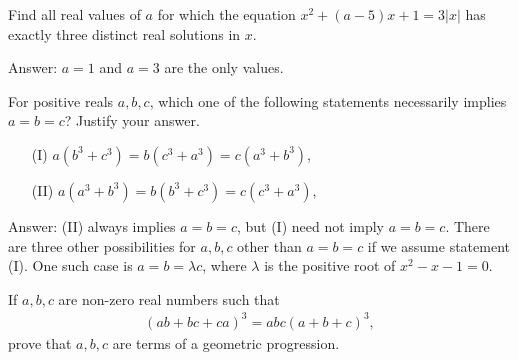 \documentclass[12pt,a4paper]{memoir}
\theoremstyle{definition}
\begin{document}
\begin{tcolorbox}
	\begin{question}
		Find all real values of $a$ for which the equation $x^2+(a-5)x+1=3|x|$ has exactly three distinct real solutions in $x$.
	\end{question}
\end{tcolorbox}


\begin{solution}[name=Solution by CRMO 2003]
	Answer: $a=1$ and $a=3$ are the only values.
\end{solution}


\begin{tcolorbox}
	\begin{question}
		For positive reals $a,b,c$, which one of the following statements necessarily implies $a=b=c$? Justify your answer.
		\begin{itemize}
			\item[(I)] $a(b^3+c^3)=b(c^3+a^3)=c(a^3+b^3)$,
			\item[(II)] $a(a^3+b^3)=b(b^3+c^3)=c(c^3+a^3)$,
		\end{itemize}
	\end{question}
\end{tcolorbox}


\begin{solution}[name=Solution by INMO 2016]
	Answer: (II) always implies $a=b=c$, but (I) need not imply $a=b=c$. There are three other possibilities for $a,b,c$ other than $a=b=c$ if we assume statement (I). One such case is $a=b=\lambda c$, where $\lambda$ is the positive root of $x^2-x-1=0$.
\end{solution}



\begin{tcolorbox}
	\begin{question}
		If $a,b,c$ are non-zero real numbers such that
		\begin{align*}
			(ab+bc+ca)^3 = abc(a+b+c)^3,
		\end{align*}
		prove that $a,b,c$ are terms of a geometric progression.
	\end{question}
\end{tcolorbox}


	
\end{document}
